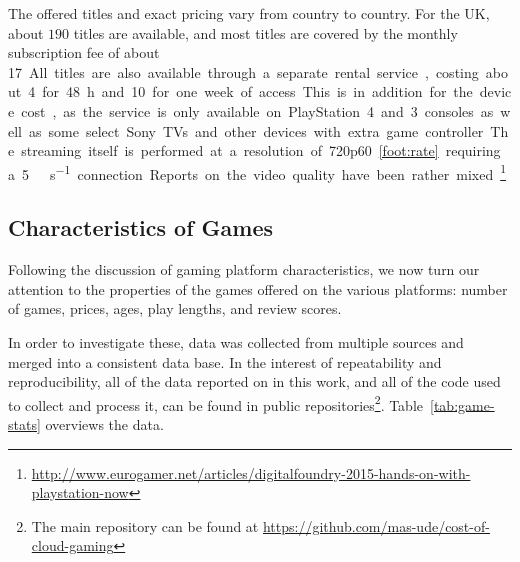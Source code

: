 The offered titles and exact pricing vary from country to country. For the UK, about $190$ titles are available, and most titles are covered by the monthly subscription fee of about \SI{17}[\EUR]. All titles are also available through a separate rental service, costing about \SI{4}[\EUR] for \SI{48}{\hour} and \SI{10}[\EUR] for one week of access. This is in addition for the device cost, as the service is only available on  PlayStation 4 and 3 consoles as well as some select Sony TVs and other devices with extra game controller.


The streaming itself is performed at a resolution of 720p60\cref{foot:rate} requiring a \SI{5}{\mega\bit\per\second} connection. Reports on the video quality have been rather mixed.\footnote{\url{http://www.eurogamer.net/articles/digitalfoundry-2015-hands-on-with-playstation-now}} %





\subsection{Characteristics of Games}

Following the discussion of gaming platform characteristics, we now turn our attention to the properties of the games offered on the various platforms: number of games, prices, ages, play lengths, and review scores.

In order to investigate these, data was collected from multiple sources and merged into a consistent data base. In the interest of repeatability and reproducibility, all of the data reported on in this work, and all of the code used to collect and process it, can be found in public repositories\footnote{The main repository can be found at \url{https://github.com/mas-ude/cost-of-cloud-gaming}}. Table~\ref{tab:game-stats} overviews the data.

